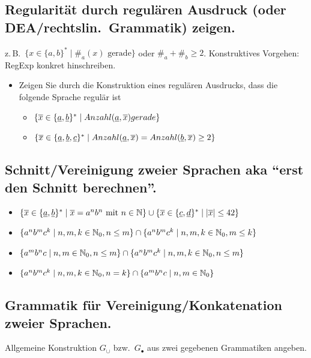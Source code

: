 \subsection{Regularität durch regulären Ausdruck (oder DEA/rechtslin.\ Grammatik) zeigen.}%
z.\,B.\ $\{x\in\{a,b\}^*\mid \#_a(x)\text{ gerade}\}$ oder $\#_a+\#_b\ge 2$.
Konstruktives Vorgehen: RegExp konkret hinschreiben.

\begin{itemize}
    \item Zeigen Sie durch die Konstruktion eines regulären Ausdrucks, dass die folgende Sprache regulär ist
    \begin{itemize}
        \item $\{ \overline{x} \in \{\underline{a}, \underline{b}\}^* \mid Anzahl(\underline{a}, \overline{x}) gerade \}$ 
        \item
        $\{ \overline{x}  \in \{\underline{a}, \underline{b}, \underline{c}\}^* \mid Anzahl(\underline{a}, \overline{x}) = Anzahl(\underline{b}, \overline{x}) \geq 2 \}$
    \end{itemize}
\end{itemize}

\subsection{Schnitt/Vereinigung zweier Sprachen aka ``erst den Schnitt berechnen''.} %
\begin{itemize}
    \item $\{\overline{x} \in \{\underline{a}, \underline{b}\}^* \mid  \overline{x} = a^n b^n \text{ mit } n \in \mathbb{N}\} \cup \{ \overline{x} \in \{\underline{c}, \underline{d}\}^* \mid |\overline{x}| \leq 42 \}$ 
    \item  $\{a^n b^m c^k \mid n,m,k \in \mathbb{N}_0, n \leq m \} \cap \{ a^n b^m c^k \mid n,m,k \in \mathbb{N}_{0}, m \leq k \}$
    \item $\{ a^m b^n c \mid n,m \in \mathbb{N}_0, n \leq m\} \cap \{a^n b^m c^k \mid n,m,k \in \mathbb{N}_0, n\leq m \}$ 
    \item   $\{a^n b^m c^k \mid n,m,k \in \mathbb{N}_0, n = k \} \cap \{ a^m b^n c \mid n,m \in \mathbb{N}_0 \}$ 
\end{itemize}


\subsection{Grammatik für Vereinigung/Konkatenation zweier Sprachen.}
Allgemeine Konstruktion $G_\cup$ bzw.\ $G_\bullet$ aus zwei gegebenen Grammatiken angeben.

